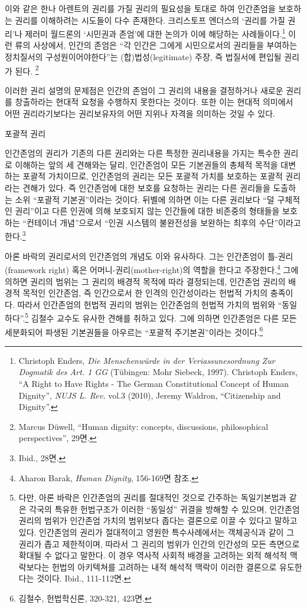 이와 같은 한나 아렌트의 권리를 가질 권리의 필요성을 토대로 하여 인간존엄을 보호하는 권리를 이해하려는 시도들이 다수 존재한다. 크리스토프 엔더스의 `권리를 가질 권리'나 제러미 월드론의 `시민권과 존엄'에 대한 논의가 이에 해당하는 사례들이다.\footnote{Christoph Enders, \emph{Die Menschenwürde in der Veriassunesordnung Zur Dogmatik des Art. 1 GG} (Tübingen: Mohr Siebeck, 1997). Christoph Enders, ``A Right to Have Rights - The German Constitutional Concept of Human Dignity'', \emph{NUJS L. Rev.} vol.3 (2010), Jeremy Waldron, ``Citizenship and Dignity''.} 이런 류의 사상에서, 인간의 존엄은 ``각 인간은 그에게 시민으로서의 권리들을 부여하는 정치질서의 구성원이어야한다''는 (합)법성(legitimate) 주장, 즉 법질서에 편입될 권리가 된다. \footnote{Marcus Düwell, ``Human dignity: concepts, discussions, philosophical perspectives'', 29면.}

이러한 권리 설명의 문제점은 인간의 존엄이 그 권리의 내용을 결정하거나 새로운 권리를 창출하라는 현대적 요청을 수행하지 못한다는 것이다. 또한 이는 현대적 의미에서 어떤 권리라기보다는 권리보유자의 어떤 지위나 자격을 의미하는 것일 수 있다.

포괄적 권리

인간존엄의 권리가 기존의 다른 권리와는 다른 특정한 권리내용을 가지는 특수한 권리로 이해하는 앞의 세 견해와는 달리, 인간존엄이 모든 기본권들의 총체적 목적을 대변하는 포괄적 가치이므로, 인간존엄의 권리는 모든 포괄적 가치를 보호하는 포괄적 권리라는 견해가 있다. 즉 인간존엄에 대한 보호를 요청하는 권리는 다른 권리들을 도출하는 소위 ``포괄적 기본권''이라는 것이다. 뒤벨에 의하면 이는 다른 권리보다 ``덜 구체적인 권리''이고 다른 인권에 의해 보호되지 않는 인간들에 대한 비존중의 형태들을 보호하는 ``컨테이너 개념''으로서 ``인권 시스템의 불완전성을 보완하는 최후의 수단''이라고 한다.\footnote{Ibid., 28면.}

아론 바락의 권리로서의 인간존엄의 개념도 이와 유사하다. 그는 인간존엄이 틀-권리(framework right) 혹은 어머니-권리(mother-right)의 역할을 한다고 주장한다.\footnote{Aharon Barak, \emph{Human Dignity}, 156-169면 참조.} 그에 의하면 권리의 범위는 그 권리의 배경적 목적에 따라 결정되는데, 인간존엄 권리의 배경적 목적인 인간존엄, 즉 인간으로서 한 인격의 인간성이라는 헌법적 가치의 충족이다. 따라서 인간존엄의 헌법적 권리의 범위는 인간존엄의 헌법적 가치의 범위와 ``동일하다''.\footnote{다만, 아론 바락은 인간존엄의 권리를 절대적인 것으로 간주하는 독일기본법과 같은 각국의 특유한 헌법구조가 이러한 ``동일성'' 귀결을 방해할 수 있으며, 인간존엄 권리의 범위가 인간존엄 가치의 범위보다 좁다는 결론으로 이끌 수 있다고 말하고 있다. 인간존엄의 권리가 절대적이고 영원한 특수사례에서는 객체공식과 같이 그 권리가 좁고 제한적이며, 따라서 그 권리의 범위가 인간의 인간성의 모든 측면으로 확대될 수 없다고 말한다. 이 경우 역사적 사회적 배경을 고려하는 외적 해석적 맥락보다는 헌법의 아키텍쳐를 고려하는 내적 해석적 맥락이 이러한 결론으로 유도한다는 것이다. Ibid., 111-112면.} 김철수 교수도 유사한 견해를 취하고 있다. 그에 의하면 인간존엄은 다른 모든 세분화되어 파생된 기본권들을 아우르는 ``포괄적 주기본권''이라는 것이다.\footnote{김철수, 헌법학신론, 320-321, 423면.}

